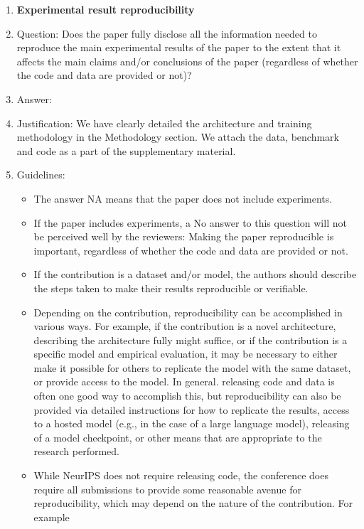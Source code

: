 \documentclass{article}
\theoremstyle{plain}
\theoremstyle{definition}
\theoremstyle{remark}
\begin{document}
\begin{enumerate}
    \item {\bf Experimental result reproducibility}
    \item[] Question: Does the paper fully disclose all the information needed to reproduce the main experimental results of the paper to the extent that it affects the main claims and/or conclusions of the paper (regardless of whether the code and data are provided or not)?
    \item[] Answer: \answerYes{} %
    \item[] Justification: We have clearly detailed the architecture and training methodology in the Methodology section. We attach the data, benchmark and code as a part of the supplementary material.
    \item[] Guidelines:
    \begin{itemize}
        \item The answer NA means that the paper does not include experiments.
        \item If the paper includes experiments, a No answer to this question will not be perceived well by the reviewers: Making the paper reproducible is important, regardless of whether the code and data are provided or not.
        \item If the contribution is a dataset and/or model, the authors should describe the steps taken to make their results reproducible or verifiable. 
        \item Depending on the contribution, reproducibility can be accomplished in various ways. For example, if the contribution is a novel architecture, describing the architecture fully might suffice, or if the contribution is a specific model and empirical evaluation, it may be necessary to either make it possible for others to replicate the model with the same dataset, or provide access to the model. In general. releasing code and data is often one good way to accomplish this, but reproducibility can also be provided via detailed instructions for how to replicate the results, access to a hosted model (e.g., in the case of a large language model), releasing of a model checkpoint, or other means that are appropriate to the research performed.
        \item While NeurIPS does not require releasing code, the conference does require all submissions to provide some reasonable avenue for reproducibility, which may depend on the nature of the contribution. For example
        \begin{enumerate}

\end{enumerate}
\end{itemize}
\end{enumerate}
\end{document}
